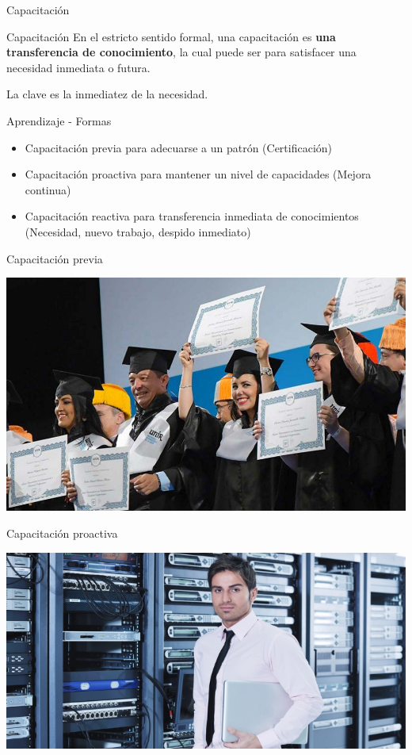 \documentclass[aspectratio=169]{beamer}
\begin{document}
\begin{frame}[fragile]{Capacitación}
    \begin{exampleblock}{Capacitación}
        En el estricto sentido formal, una capacitación es \textbf{una transferencia de conocimiento}, la cual puede ser para satisfacer una necesidad inmediata o futura.
        
        La clave es la inmediatez de la necesidad.
    \end{exampleblock}
\end{frame}

\begin{frame}[fragile]{Aprendizaje - Formas}
    \begin{itemize}
        \item Capacitación previa para adecuarse a un patrón (Certificación)
        \item Capacitación proactiva para mantener un nivel de capacidades (Mejora continua)
        \item Capacitación reactiva para transferencia inmediata de conocimientos (Necesidad, nuevo trabajo, despido inmediato)
    \end{itemize}
\end{frame}

\begin{frame}[fragile]{Capacitación previa}
    \begin{center}
        \includegraphics[width=0.7\linewidth]{Images/graduacion}
    \end{center}	
\end{frame}


\begin{frame}[fragile]{Capacitación proactiva}
    \begin{center}
        \includegraphics[width=0.6\linewidth]{Images/sistemas}
    \end{center}	
\end{frame}
\end{document}
